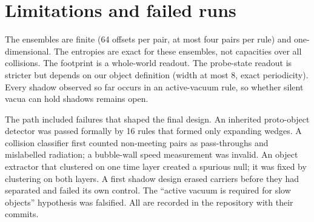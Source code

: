 \section{Limitations and failed runs}\label{sec:limits}
The ensembles are finite (64 offsets per pair, at most four pairs per rule) and one-dimensional.
The entropies are exact for these ensembles, not capacities over all collisions. The footprint is a
whole-world readout. The probe-state readout is stricter but depends on our object definition (width
at most 8, exact periodicity). Every shadow observed so far occurs in an active-vacuum rule, so whether
silent vacua can hold shadows remains open.

The path included failures that shaped the final design. An inherited proto-object detector
was passed formally by 16 rules that formed only expanding wedges. A collision classifier first
counted non-meeting pairs as pass-throughs and mislabelled radiation; a bubble-wall speed
measurement was invalid. An object extractor that clustered on one time layer created a spurious
null; it was fixed by clustering on both layers. A first shadow design erased carriers before they had
separated and failed its own control. The ``active vacuum is required for slow objects'' hypothesis
was falsified. All are recorded in the repository with their commits.
